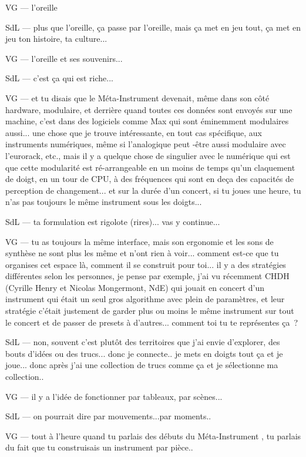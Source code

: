 VG — l'oreille 

SdL — plus que l'oreille, ça passe par l'oreille, mais ça met en jeu tout, ça met en jeu ton histoire, ta culture... 

VG — l'oreille et ses souvenirs... 

SdL — c'est ça qui est riche... 

VG — et tu disais que le Méta-Instrument devenait, même dans son côté hardware, modulaire, et derrière quand toutes ces données sont envoyés sur une machine, c'est dans des logiciels comme Max qui sont éminemment modulaires aussi... une chose que je trouve intéressante, en tout cas spécifique, aux instruments numériques, même si l'analogique peut -être aussi modulaire avec l'eurorack, etc., mais il y a quelque chose de singulier avec le numérique qui est que cette modularité est ré-arrangeable en un moins de temps qu'un claquement de doigt, en un tour de CPU, à des fréquences qui sont en deça des capacités de perception de changement... et sur la durée d'un concert, si tu joues une heure, tu n'as pas toujours le même instrument sous les doigts... 

SdL — ta formulation est rigolote (rires)... vas y continue... 

VG — tu as toujours la même interface, mais son ergonomie et les sons de synthèse ne sont plus les même et n'ont rien à voir... comment est-ce que tu organises cet espace là, comment il se construit pour toi... il y a des stratégies différentes selon les personnes, je pense par exemple, j'ai vu récemment CHDH (Cyrille Henry et Nicolas Mongermont, NdE) qui jouait en concert d'un instrument qui était un seul gros algorithme avec plein de paramètres, et leur stratégie c'était justement de garder plus ou moins le même instrument sur tout le concert et de passer de presets à d'autres... comment toi tu te représentes ça ? 

SdL — non, souvent c'est plutôt des territoires que j'ai envie d'explorer, des bouts d'idées ou des trucs... donc je connecte.. je mets en doigts tout ça et je joue... donc après j'ai une collection de trucs comme ça et je sélectionne ma collection.. 

VG — il y a l'idée de fonctionner par tableaux, par scènes... 

SdL — on pourrait dire par mouvements...par moments.. 

VG — tout à l'heure quand tu parlais des débuts du Méta-Instrument , tu parlais du fait que tu construisais un instrument par pièce.. 

